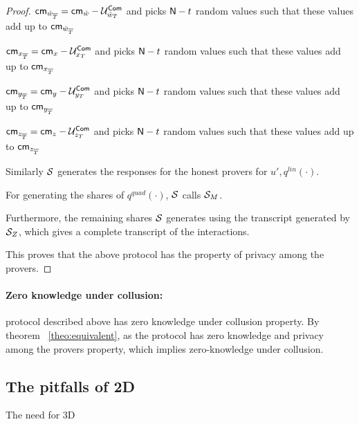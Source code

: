 \begin{proof}
	$\mathsf{cm}_{\hat{w}_{\overline{T}}} = \mathsf{cm}_{\hat{w}}-\mathcal{U}^{\mathsf{Com}}_{\hat{w}_{T}}$
	and picks $\mathsf{N} - t$ random values such that these values add up to $\mathsf{cm}_{\hat{w}_{\overline{T}}}$
	
	$\mathsf{cm}_{x_{\overline{T}}} = \mathsf{cm}_{x}-\mathcal{U}^{\mathsf{Com}}_{x_{T}}$
	and picks $\mathsf{N} - t$ random values such that these values add up to $\mathsf{cm}_{x_{\overline{T}}}$
	
	$\mathsf{cm}_{y_{\overline{T}}} = \mathsf{cm}_{y}-\mathcal{U}^{\mathsf{Com}}_{y_{T}}$
	and picks $\mathsf{N} - t$ random values such that these values add up to $\mathsf{cm}_{y_{\overline{T}}}$
	
	$\mathsf{cm}_{z_{\overline{T}}} = \mathsf{cm}_{z}-\mathcal{U}^{\mathsf{Com}}_{z_{T}}$
	and picks $\mathsf{N} - t$ random values such that these values add up to $\mathsf{cm}_{z_{\overline{T}}}$
	
	Similarly $\mathcal{S}$ generates the responses for the honest provers for $u', q^{lin}(\cdot)$. 
	
	For generating the shares of $q^{quad}(\cdot)$, $\mathcal{S}$ calls $\mathcal{S}_{M}$.
	
	Furthermore, the remaining shares $\mathcal{S}$ generates using the transcript generated by $\mathcal{S}_{Z}$, which gives a complete transcript of the interactions.
	
	This proves that the above protocol has the property of privacy among the provers. 
\end{proof}

\paragraph{Zero knowledge under collusion: } protocol described above has zero knowledge under collusion property. By theorem ~\ref{theo:equivalent}, as the protocol has zero knowledge and privacy among the provers property, which implies zero-knowledge under collusion.

\subsection{The pitfalls of 2D}
The need for 3D